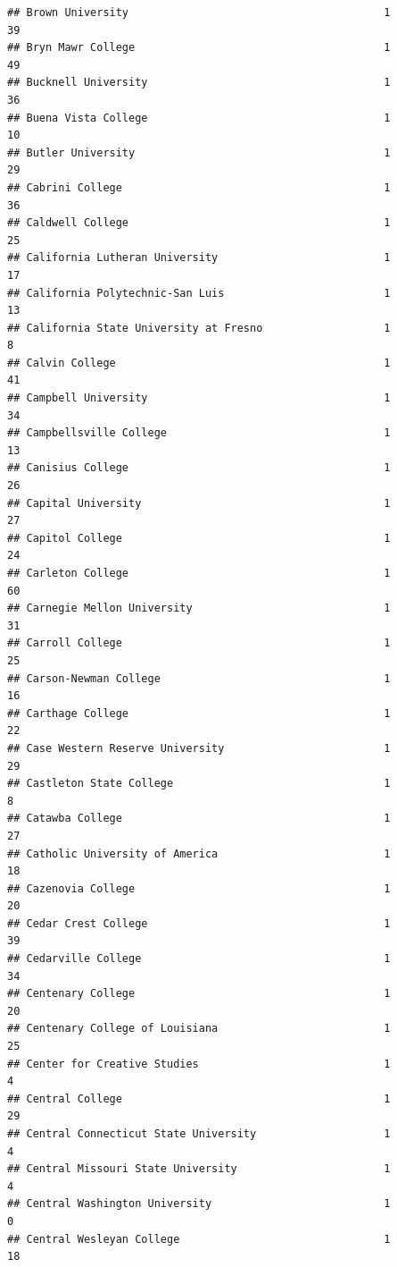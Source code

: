 \documentclass[
]{article}
\begin{document}
\begin{verbatim}
## Brown University                                        1          39
## Bryn Mawr College                                       1          49
## Bucknell University                                     1          36
## Buena Vista College                                     1          10
## Butler University                                       1          29
## Cabrini College                                         1          36
## Caldwell College                                        1          25
## California Lutheran University                          1          17
## California Polytechnic-San Luis                         1          13
## California State University at Fresno                   1           8
## Calvin College                                          1          41
## Campbell University                                     1          34
## Campbellsville College                                  1          13
## Canisius College                                        1          26
## Capital University                                      1          27
## Capitol College                                         1          24
## Carleton College                                        1          60
## Carnegie Mellon University                              1          31
## Carroll College                                         1          25
## Carson-Newman College                                   1          16
## Carthage College                                        1          22
## Case Western Reserve University                         1          29
## Castleton State College                                 1           8
## Catawba College                                         1          27
## Catholic University of America                          1          18
## Cazenovia College                                       1          20
## Cedar Crest College                                     1          39
## Cedarville College                                      1          34
## Centenary College                                       1          20
## Centenary College of Louisiana                          1          25
## Center for Creative Studies                             1           4
## Central College                                         1          29
## Central Connecticut State University                    1           4
## Central Missouri State University                       1           4
## Central Washington University                           1           0
## Central Wesleyan College                                1          18

\end{verbatim}
\end{document}
